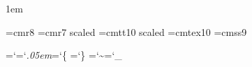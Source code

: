 \xdef\fmtversion{\fmtversion+AWEBMAC1.0}
\parskip 0pt %
\parindent 1em %

\font\eightrm=cmr8
\let\sc=\eightrm \let\mainfont=\tenrm
\font\titlefont=cmr7 scaled %
\font\ttitlefont=cmtt10 scaled %
\font\tentex=cmtex10 %
\font\predef=cmss9 %

\def\newusc{\leavevmode \vbox{\hrule width.3em}\kern.06em}
\def\?{\ifmmode\null$\else$\null\fi} %
\def\bn#1#2{\hbox{$\hbox{\it #2\/}_{#1}$}} %
\def\ANT{\mathrel{\hbox{\&{and} \&{then}}}} %
\def\ORE{\mathrel{\hbox{\&{or} \&{else}}}} %
\def\ORW{\hbox{\&{or} \&{when}\ }} %
\def\8{\ifmmode \null$ $\null\else {} \fi} %
\def\KR{\ifmmode\Rightarrow\else$\null\Rightarrow$\fi} %
\def\dst{\ast\ast} %
\def\BL{\ifmmode\langle\!\langle\else\null$\langle\!\langle$\null\fi}%
\def\EL{\ifmmode\rangle\!\rangle\else\null$\rangle\!\rangle$\null\fi}%
\def\BOX{\.{<>}}
\def\p#1{\let\_=\newusc\hbox{\predef#1}}
\def\s#1{\hbox{\sl#1\/}}
\def\\#1{\hbox{\it#1\/\kern.05em}} %
\def\|#1{\hbox{$#1$}} %
\def\&#1{\hbox{\bf#1\/}} %
\def\.#1{\hbox{\tentex %
  \let\\=\BS %
  \let\'=\RQ %
  \let\`=\LQ %
  \let\{=\LB %
  \let\}=\RB %
  \let\~=\TL %
  \let\ =\SP %
  \let\_=\UL %
  \let\&=\AM %
  #1}}
\def\#{\hbox{\tt\char`\#}} %
\def\${\hbox{\tt\char`\$}} %
\def\%{\hbox{\tt\char`\%}} %
\def\^{\ifmmode\mathchar"222 \else\char`^ \fi} %
\def\AT!{@} %

\chardef\AM=`\& %
\chardef\BS=`\\ %
\chardef\LB=`\{ %
\def\LQ{{\tt\char'22}} %
\chardef\RB=`\} %
\def\RQ{{\tt\char'23}} %
\def\SP{{\tt\char`\ }} %
\chardef\TL=`\~ %
\chardef\UL=`\_ %


